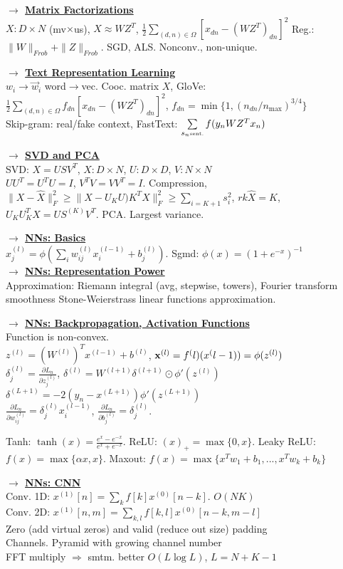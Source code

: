 \documentclass[11pt]{article}
\newcommand{\myvector}[1]{{\bf{#1}}}
\newcommand{\x}{\myvector{x}}
\newcommand{\mytitle}[1]{ {\bf $\rightarrow$ \underline{#1}}\\}
\begin{document}
\begin{multicols*}{2}
\mytitle{Matrix Factorizations}
$X\colon D\times N$ (mv$\times$us), $X\approx WZ^T$, $\frac{1}{2}\sum\limits_{(d,n)\in\Omega}\left[x_{dn}-(WZ^T)_{dn}\right]^2$
Reg.: $\|W\|_{Frob}+\|Z\|_{Frob}$.
SGD, ALS. Nonconv., non-unique.


\mytitle{Text Representation Learning}
$w_i\to\vec{w}_i$ word$\rightarrow$vec.
Cooc. matrix $X$, GloVe:\\ $\frac{1}{2}\sum\limits_{(d,n)\in\Omega}f_{dn}\left[x_{dn}-(WZ^T)_{dn}\right]^2$, $f_{dn}=\min\{1,(n_{dn}/n_{\max})^{3/4}\}$\\
Skip-gram: real/fake context, FastText: $\sum\limits_{s_n\mbox{\tiny sent.}}f(y_nWZ^Tx_n)$

\mytitle{SVD and PCA}
SVD: $X=USV^T$, $X\colon D\times N$, $U\colon D\times D$, $V\colon N\times N$\\
$UU^T=U^TU=I$, $V^TV=VV^T=I$.
Compression, $\|X-\hat{X}\|^2_F\geqslant \|X-U_KU)K^TX\|^2_F\geqslant\sum\limits_{i=K+1}s_i^2$, $rk\hat{X}=K$, $U_KU_K^TX=US^{(K)}V^T$.
PCA. Largest variance.

\mytitle{NNs: Basics}
$x_j^{(l)}=\phi\left(\sum\limits_iw_{ij}^{(l)}x_i^{(l-1)}+b_j^{(l)}\right)$.
Sgmd: $\phi(x)=(1+e^{-x})^{-1}$\\

\mytitle{NNs: Representation Power}
Approximation: Riemann integral (avg, stepwise, towers), Fourier transform smoothness
Stone-Weierstrass linear functions approximation.

\mytitle{NNs: Backpropagation, Activation Functions}
Function is non-convex.\\
$z^{(l)}=(W^{(l)})^Tx^{(l-1)}+b^{(l)}$, $\x^{(l)}=f^({l})(x^({l-1}))=\phi(z^{(l)})$\\
$\delta_j^{(l)}=\frac{\partial L_n}{\partial z_j^{(l)}}$, $\delta^{(l)}=W^{(l+1)}\delta^{(l+1)}\odot \phi'(z^{(l)})$\\
$\delta^{(L+1)}=-2(y_n-x^{(L+1)})\phi'(z^{(L+1)})$\\
$\frac{\partial L_n}{\partial w_{ij}^{(l)}}=\delta^{(l)}_jx_i^{(l-1)}$,
$\frac{\partial L_n}{\partial b_{j}^{(l)}}=\delta^{(l)}_j$.

Tanh: $\tanh(x)=\frac{e^x-e^{-x}}{e^x+e^{-x}}$.
ReLU: $(x)_+=\max\{0, x\}$.
Leaky ReLU: $f(x)=\max\{\alpha x, x\}$.
Maxout: $f(x)=\max\{x^Tw_1+b_1,...,x^Tw_k+b_k\}$

\mytitle{NNs: CNN}
Conv. 1D: $x^{(1)}[n]=\sum\limits_kf[k]x^{(0)}[n-k]$. $O(NK)$\\
Conv. 2D: $x^{(1)}[n,m]=\sum\limits_{k,l}f[k,l]x^{(0)}[n-k,m-l]$\\
Zero (add virtual zeros) and valid (reduce out size) padding\\
Channels. Pyramid with growing channel number\\
FFT multiply $\Rightarrow$ smtm. better $O(L\log L)$, $L=N+K-1$\\


\end{multicols*}
\end{document}
